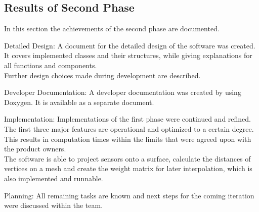 \subsection{Results of Second Phase}
In this section the achievements of the second phase are documented.
\begin{aims}
	\item[\hspace*{11mm} Detailed Design:]A document for the detailed design of the software was created.
	 It covers implemented classes and their structures, while giving explanations for all functions and components. \\
	 Further design choices made during development are described.

\end{aims}

\begin{aims}	
	\item[\hspace*{11mm} Developer Documentation:]A developer documentation was created by using Doxygen. It is available as a separate document.   
\end{aims}

\begin{aims}
	\item[\hspace*{11mm} Implementation:]Implementations of the first phase were continued and refined. 
	The first three major features are operational and optimized to a certain degree. \\
	This results in computation times within the limits that were agreed upon with the product owners.\\
	 The software is able to project sensors onto a surface, calculate the distances of vertices on a mesh and create  the weight matrix for later interpolation, which is also implemented and runnable. 
\end{aims}

\begin{aims}	
	\item[\hspace*{11mm} Planning:]All remaining tasks are known and next steps for the coming iteration were discussed within the team.   
\end{aims}